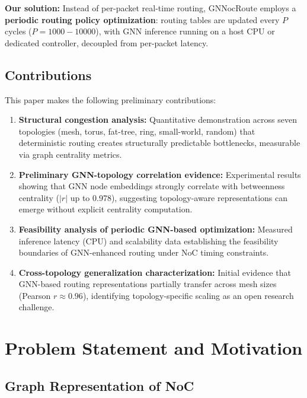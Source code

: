 \documentclass[conference]{IEEEtran}
\begin{document}
\textbf{Our solution:} Instead of per-packet real-time routing, GNNocRoute employs a \textbf{periodic routing policy optimization}: routing tables are updated every $P$ cycles ($P=1000{-}10000$), with GNN inference running on a host CPU or dedicated controller, decoupled from per-packet latency.

\subsection{Contributions}
\label{sec:contributions}

This paper makes the following preliminary contributions:

\begin{enumerate}
    \item \textbf{Structural congestion analysis:} Quantitative demonstration across seven topologies (mesh, torus, fat-tree, ring, small-world, random) that deterministic routing creates structurally predictable bottlenecks, measurable via graph centrality metrics.
    \item \textbf{Preliminary GNN-topology correlation evidence:} Experimental results showing that GNN node embeddings strongly correlate with betweenness centrality ($|r|$ up to 0.978), suggesting topology-aware representations can emerge without explicit centrality computation.
    \item \textbf{Feasibility analysis of periodic GNN-based optimization:} Measured inference latency (CPU) and scalability data establishing the feasibility boundaries of GNN-enhanced routing under NoC timing constraints.
    \item \textbf{Cross-topology generalization characterization:} Initial evidence that GNN-based routing representations partially transfer across mesh sizes (Pearson $r \approx 0.96$), identifying topology-specific scaling as an open research challenge.
\end{enumerate}


\section{Problem Statement and Motivation}
\label{sec:problem}

\subsection{Graph Representation of NoC}
\end{document}
